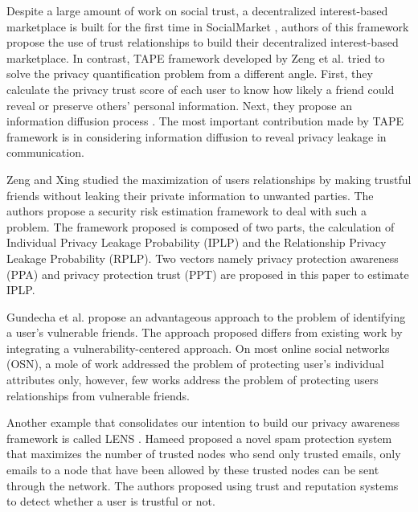 Despite a large amount of work on social trust,
	a decentralized interest-based marketplace is built for the first time in SocialMarket \cite{frey_social_2011},
	authors of this framework propose the use of trust relationships to build their decentralized interest-based marketplace.
In contrast,
	TAPE framework developed by Zeng et al. \cite{yongbozeng_study_2015} tried to solve the privacy quantification problem \cite{gundecha_exploiting_2011} from a different angle.
First,
	they calculate the privacy trust score of each user to know how likely a friend could reveal or preserve others’ personal information.
Next,
	they propose an information diffusion process \cite{fang_privacy_2010}.
The most important contribution made by TAPE framework \cite{yongbozeng_study_2015} is in considering information diffusion to reveal privacy leakage in communication.

Zeng and Xing \cite{zeng_trustaware_2014}
	studied the maximization of users relationships by making trustful friends without leaking their private information to unwanted parties.
The authors propose a security risk estimation framework to deal with such a problem.
The framework proposed is composed of two parts,
	the calculation of Individual Privacy Leakage Probability (IPLP) and the Relationship Privacy Leakage Probability (RPLP).
Two vectors namely privacy protection awareness (PPA) and privacy protection trust (PPT) are proposed in this paper to estimate IPLP.

Gundecha et al. \cite{gundecha_exploiting_2011} propose an advantageous approach to the problem of identifying a user’s vulnerable friends.
The approach proposed differs from existing work by integrating a vulnerability-centered approach.
On most online social networks (OSN),
	a mole of work addressed the problem of protecting user's individual attributes only,
	however,
	few works address the problem of protecting users relationships from vulnerable friends.

Another example that consolidates our intention to build our privacy awareness framework is called LENS \cite{hameed_lens_2011}.
Hameed \cite{hameed_lens_2011} proposed a novel spam protection system that maximizes the number of trusted nodes who send only trusted emails,
	only emails to a node that have been allowed by these trusted nodes can be sent through the network.
The authors proposed using trust and reputation systems to detect whether a user is trustful or not.

